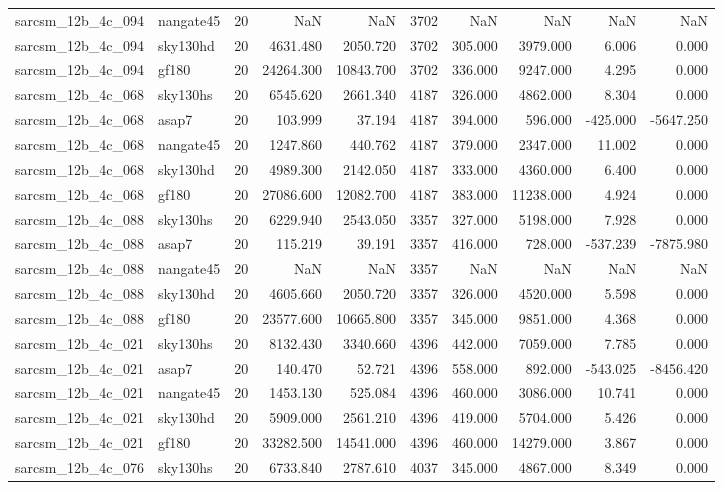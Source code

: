 \begin{longtable}{llrrrrrrrr}
sarcsm\_12b\_4c\_094 & nangate45 & 20 & NaN & NaN & 3702 & NaN & NaN & NaN & NaN \\
sarcsm\_12b\_4c\_094 & sky130hd & 20 & 4631.480 & 2050.720 & 3702 & 305.000 & 3979.000 & 6.006 & 0.000 \\
sarcsm\_12b\_4c\_094 & gf180 & 20 & 24264.300 & 10843.700 & 3702 & 336.000 & 9247.000 & 4.295 & 0.000 \\
sarcsm\_12b\_4c\_068 & sky130hs & 20 & 6545.620 & 2661.340 & 4187 & 326.000 & 4862.000 & 8.304 & 0.000 \\
sarcsm\_12b\_4c\_068 & asap7 & 20 & 103.999 & 37.194 & 4187 & 394.000 & 596.000 & -425.000 & -5647.250 \\
sarcsm\_12b\_4c\_068 & nangate45 & 20 & 1247.860 & 440.762 & 4187 & 379.000 & 2347.000 & 11.002 & 0.000 \\
sarcsm\_12b\_4c\_068 & sky130hd & 20 & 4989.300 & 2142.050 & 4187 & 333.000 & 4360.000 & 6.400 & 0.000 \\
sarcsm\_12b\_4c\_068 & gf180 & 20 & 27086.600 & 12082.700 & 4187 & 383.000 & 11238.000 & 4.924 & 0.000 \\
sarcsm\_12b\_4c\_088 & sky130hs & 20 & 6229.940 & 2543.050 & 3357 & 327.000 & 5198.000 & 7.928 & 0.000 \\
sarcsm\_12b\_4c\_088 & asap7 & 20 & 115.219 & 39.191 & 3357 & 416.000 & 728.000 & -537.239 & -7875.980 \\
sarcsm\_12b\_4c\_088 & nangate45 & 20 & NaN & NaN & 3357 & NaN & NaN & NaN & NaN \\
sarcsm\_12b\_4c\_088 & sky130hd & 20 & 4605.660 & 2050.720 & 3357 & 326.000 & 4520.000 & 5.598 & 0.000 \\
sarcsm\_12b\_4c\_088 & gf180 & 20 & 23577.600 & 10665.800 & 3357 & 345.000 & 9851.000 & 4.368 & 0.000 \\
sarcsm\_12b\_4c\_021 & sky130hs & 20 & 8132.430 & 3340.660 & 4396 & 442.000 & 7059.000 & 7.785 & 0.000 \\
sarcsm\_12b\_4c\_021 & asap7 & 20 & 140.470 & 52.721 & 4396 & 558.000 & 892.000 & -543.025 & -8456.420 \\
sarcsm\_12b\_4c\_021 & nangate45 & 20 & 1453.130 & 525.084 & 4396 & 460.000 & 3086.000 & 10.741 & 0.000 \\
sarcsm\_12b\_4c\_021 & sky130hd & 20 & 5909.000 & 2561.210 & 4396 & 419.000 & 5704.000 & 5.426 & 0.000 \\
sarcsm\_12b\_4c\_021 & gf180 & 20 & 33282.500 & 14541.000 & 4396 & 460.000 & 14279.000 & 3.867 & 0.000 \\
sarcsm\_12b\_4c\_076 & sky130hs & 20 & 6733.840 & 2787.610 & 4037 & 345.000 & 4867.000 & 8.349 & 0.000 \\

\end{longtable}
